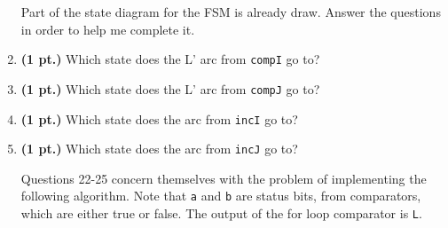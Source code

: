 \documentclass{article}
\begin{document}
\begin{enumerate}
Part of the state diagram for the FSM is already draw.  Answer the
questions in order to help me complete it.


\item{\bf(1 pt.)} Which state does the L' arc from \verb+compI+ go to?

\item{\bf(1 pt.)} Which state does the L' arc from \verb+compJ+ go to?


\item{\bf(1 pt.)} Which state does the arc from \verb+incI+ go to?

\item{\bf(1 pt.)} Which state does the arc from \verb+incJ+ go to?

\pagebreak
Questions 22-25 concern themselves with the problem of 
implementing the following algorithm.  Note that \verb+a+
and \verb+b+ are status bits, from comparators, which 
are either true or false.  The output of the for loop
comparator is \verb+L+.


\end{enumerate}
\end{document}
